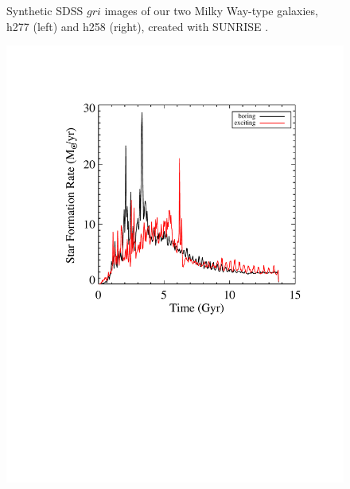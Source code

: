 \documentclass[nofootinbib,twocolumn,prd]{emulateapj}
\begin{document}
\begin{figure}
\caption{Synthetic SDSS $gri$ images of our two Milky Way-type galaxies, h277 (left) and h258 (right), created with \textsc{SUNRISE} \citep{Jonsson06}.
\label{fig:images}
}
\end{figure}


\begin{figure}
\includegraphics[width=\columnwidth]{Figures/sfh}

\end{figure}
\end{document}
